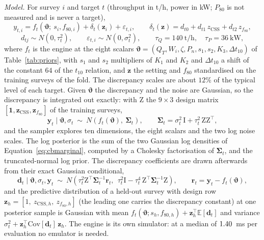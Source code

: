 \emph{Model.} For survey $i$ and target $t$ (throughput in t/h, power in kW; $P_{80}$ is not measured and is never a target),
\begin{equation}
y_{t,i} = f_t\!\left(\boldsymbol\vartheta;\ s_i, f_{80,i}\right) + \delta_t(\mathbf z_i) + \varepsilon_{t,i},\qquad
\delta_t(\mathbf z) = d_{t0} + d_{t1}\,z_{\mathrm{CSS}} + d_{t2}\,z_{f_{80}},
\label{eq:cbmodel}
\end{equation}
\begin{equation}
d_{tj}\sim N(0,\tau_t^2),\qquad \varepsilon_{t,i}\sim N(0,\sigma_t^2),\qquad \tau_Q = 140\ \mathrm{t/h},\quad \tau_P = 36\ \mathrm{kW},
\label{eq:cbprior}
\end{equation}
where $f_t$ is the engine at the eight scalars $\boldsymbol\vartheta=(Q_T, W_i, \zeta, P_n, s_1, s_2, K_3, \Delta t_{10})$ of
Table~\ref{tab:priors}, with $s_1$ and $s_2$ multipliers of $K_1$ and $K_2$ and $\Delta t_{10}$ a shift of the constant $64$ of the $t_{10}$
relation, and $\mathbf z$ the setting and $f_{80}$ standardised on the training surveys of the fold. The discrepancy scales are about $12\%$ of
the typical level of each target. Given $\boldsymbol\vartheta$ the discrepancy and the noise are Gaussian, so the discrepancy is integrated out
exactly: with $\mathrm Z$ the $9\times3$ design matrix $[\mathbf 1, \mathbf z_{\mathrm{CSS}}, \mathbf z_{f_{80}}]$ of the training surveys,
\begin{equation}
\mathbf y_t \mid \boldsymbol\vartheta,\sigma_t \ \sim\ N\!\left(f_t(\boldsymbol\vartheta),\ \boldsymbol\Sigma_t\right),\qquad
\boldsymbol\Sigma_t = \sigma_t^2\,\mathrm I + \tau_t^2\,\mathrm Z\mathrm Z^{\top},
\label{eq:cbmarginal}
\end{equation}
and the sampler explores ten dimensions, the eight scalars and the two log noise scales. The log posterior is the sum of the two Gaussian log
densities of Equation~\eqref{eq:cbmarginal}, computed by a Cholesky factorisation of $\boldsymbol\Sigma_t$, and the truncated-normal log prior. The
discrepancy coefficients are drawn afterwards from their exact Gaussian conditional,
\begin{equation}
\mathbf d_t\mid\boldsymbol\vartheta,\sigma_t,\mathbf y_t\ \sim\
N\!\left(\tau_t^2\mathrm Z^{\top}\boldsymbol\Sigma_t^{-1}\mathbf r_t,\ \ \tau_t^2\mathrm I - \tau_t^4\,\mathrm Z^{\top}\boldsymbol\Sigma_t^{-1}\mathrm Z\right),\qquad
\mathbf r_t = \mathbf y_t - f_t(\boldsymbol\vartheta),
\label{eq:cbcond}
\end{equation}
and the predictive distribution of a held-out survey with design row $\mathbf z_h=[1,\ z_{\mathrm{CSS},h},\ z_{f_{80},h}]$ (the
leading one carries the discrepancy constant) at one posterior sample is Gaussian with mean
$f_t(\boldsymbol\vartheta;s_h,f_{80,h})+\mathbf z_h^{\top}\mathbb E[\mathbf d_t]$ and variance $\sigma_t^2+\mathbf z_h^{\top}\mathrm{Cov}[\mathbf
d_t]\,\mathbf z_h$. The engine is its own simulator: at a median of $1.40$~ms per evaluation no emulator is needed.

